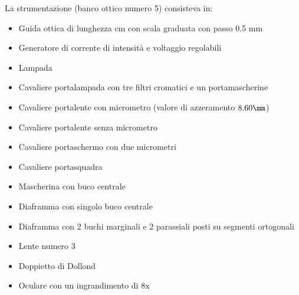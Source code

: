 La strumentazione (banco ottico numero 5) consisteva in:
\begin{itemize}
\item Guida ottica di lunghezza  cm con scala graduata con passo 0.5 mm
\item Generatore di corrente di intensità e voltaggio regolabili
\item Lampada 
\item Cavaliere portalampada con tre filtri cromatici e un portamascherine
\item Cavaliere portalente con micrometro (valore di azzeramento $8.60 \mm$)
\item Cavaliere portalente senza micrometro
\item Cavaliere portaschermo con due micrometri
\item Cavaliere portasquadra
\item Mascherina con buco centrale
\item Diaframma con singolo buco centrale
\item Diaframma con 2 buchi marginali e 2 parassiali posti su segmenti ortogonali
\item Lente numero 3
\item Doppietto di Dollond
\item Oculare con un ingrandimento di 8x
\end{itemize}
